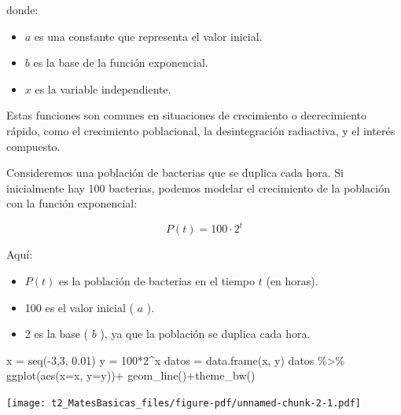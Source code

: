 \documentclass[
  letterpaper,
  DIV=11,
  numbers=noendperiod]{scrreprt}
\newenvironment{Shaded}{\begin{snugshade}}{\end{snugshade}}
\newcommand{\AttributeTok}[1]{\textcolor[rgb]{0.40,0.45,0.13}{#1}}
\newcommand{\DecValTok}[1]{\textcolor[rgb]{0.68,0.00,0.00}{#1}}
\newcommand{\FloatTok}[1]{\textcolor[rgb]{0.68,0.00,0.00}{#1}}
\newcommand{\FunctionTok}[1]{\textcolor[rgb]{0.28,0.35,0.67}{#1}}
\newcommand{\NormalTok}[1]{\textcolor[rgb]{0.00,0.23,0.31}{#1}}
\newcommand{\OtherTok}[1]{\textcolor[rgb]{0.00,0.23,0.31}{#1}}
\newcommand{\SpecialCharTok}[1]{\textcolor[rgb]{0.37,0.37,0.37}{#1}}
\providecommand{\tightlist}{%
  \setlength{\itemsep}{0pt}\setlength{\parskip}{0pt}}\usepackage{longtable,booktabs,array}
\begin{document}
donde:

\begin{itemize}
\tightlist
\item
  \(a\) es una constante que representa el valor inicial.
\item
  \(b\) es la base de la función exponencial.
\item
  \(x\) es la variable independiente.
\end{itemize}

Estas funciones son comunes en situaciones de crecimiento o
decrecimiento rápido, como el crecimiento poblacional, la desintegración
radiactiva, y el interés compuesto.

Consideremos una población de bacterias que se duplica cada hora. Si
inicialmente hay 100 bacterias, podemos modelar el crecimiento de la
población con la función exponencial:

\[P(t) = 100 \cdot 2^t\]

Aquí:

\begin{itemize}
\tightlist
\item
  \(P(t)\) es la población de bacterias en el tiempo \(t\) (en horas).
\item
  100 es el valor inicial ( \(a\) ).
\item
  2 es la base ( \(b\) ), ya que la población se duplica cada hora.
\end{itemize}

\begin{Shaded}
\begin{Highlighting}[]
\NormalTok{x }\OtherTok{=} \FunctionTok{seq}\NormalTok{(}\SpecialCharTok{{-}}\DecValTok{3}\NormalTok{,}\DecValTok{3}\NormalTok{, }\FloatTok{0.01}\NormalTok{)}
\NormalTok{y }\OtherTok{=} \DecValTok{100}\SpecialCharTok{*}\DecValTok{2}\SpecialCharTok{\^{}}\NormalTok{x}
\NormalTok{datos }\OtherTok{=} \FunctionTok{data.frame}\NormalTok{(x, y)}
\NormalTok{datos }\SpecialCharTok{\%\textgreater{}\%} \FunctionTok{ggplot}\NormalTok{(}\FunctionTok{aes}\NormalTok{(}\AttributeTok{x=}\NormalTok{x, }\AttributeTok{y=}\NormalTok{y))}\SpecialCharTok{+}
  \FunctionTok{geom\_line}\NormalTok{()}\SpecialCharTok{+}\FunctionTok{theme\_bw}\NormalTok{()}
\end{Highlighting}
\end{Shaded}

\texttt{[image: t2\_MatesBasicas\_files/figure-pdf/unnamed-chunk-2-1.pdf]}
\end{document}
